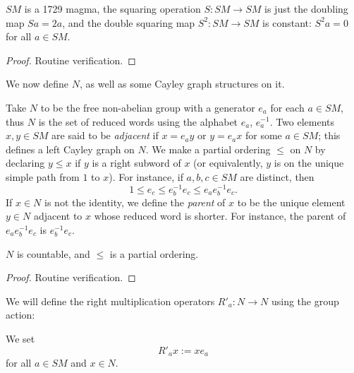 \begin{lemma}\label{sm-1729}\leanok $SM$ is a 1729 magma, the squaring operation $S: SM \to SM$ is just the doubling map $Sa = 2a$, and the double squaring map $S^2: SM \to SM$ is constant: $S^2 a = 0$ for all $a \in SM$.
\end{lemma}

\begin{proof}\leanok Routine verification.
\end{proof}

We now define $N$, as well as some Cayley graph structures on it.

\begin{definition}[Definition of $N$]\label{n-def}\leanok Take $N$ to be the free non-abelian group with a generator $e_a$ for each $a \in SM$, thus $N$ is the set of reduced words using the alphabet $e_a$, $e_a^{-1}$.  Two elements $x,y \in SM$ are said to be \emph{adjacent} if $x = e_a y$ or $y = e_a x$ for some $a \in SM$; this defines a left Cayley graph on $N$.  We make a partial ordering $\leq$ on $N$ by declaring $y \leq x$ if $y$ is a right subword of $x$ (or equivalently, $y$ is on the unique simple path from $1$ to $x$).  For instance, if $a,b,c \in SM$ are distinct, then
  $$ 1 \leq e_c \leq e_b^{-1} e_c \leq e_a e_b^{-1} e_c.$$
If $x \in N$ is not the identity, we define the \emph{parent} of $x$ to be the unique element $y \in N$ adjacent to $x$ whose reduced word is shorter.  For instance, the parent of $e_a e_b^{-1} e_c$ is $e_b^{-1} e_c$.
\end{definition}

\begin{lemma}\label{n-prop}\leanok  $N$ is countable, and $\leq$ is a partial ordering.
\end{lemma}

\begin{proof}\leanok Routine verification.
\end{proof}

We will define the right multiplication operators $R'_a: N \to N$ using the group action:

\begin{definition}[Definition of $R'_a$]\label{ra-defn}\leanok We set
  \begin{equation}\label{ra-def}
    R'_a x := x e_a
  \end{equation}
  for all $a \in SM$ and $x \in N$.
\end{definition}

